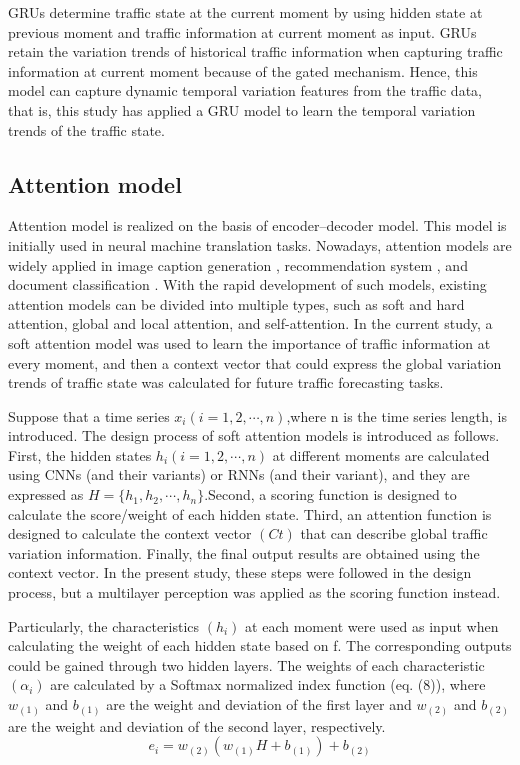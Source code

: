 \documentclass[10pt,journal,compsoc]{IEEEtran}
\begin{document}
\par GRUs determine traffic state at the current moment by using hidden state at previous moment and traffic information at current moment as input. GRUs retain the variation trends of historical traffic information when capturing traffic information at current moment because of the gated mechanism. Hence, this model can capture dynamic temporal variation features from the traffic data, that is, this study has applied a GRU model to learn the temporal variation trends of the traffic state.

\subsection{Attention model}
\par Attention model is realized on the basis of encoder–decoder model. This model is initially used in neural machine translation tasks\cite{bahdanau2014neural}. Nowadays, attention models are widely applied in image caption generation \cite{xu2015attend}, recommendation system \cite{xiao2017attentional}, and document classification \cite{Pappas2017Multilingual}. With the rapid development of such models, existing attention models can be divided into multiple types, such as soft and hard attention\cite{bahdanau2014neural}, global and local attention\cite{Luong2015Effective}, and self-attention\cite{vaswani2017attention}. In the current study, a soft attention model was used to learn the importance of traffic information at every moment, and then a context vector that could express the global variation trends of traffic state was calculated for future traffic forecasting tasks.
\par Suppose that a time series $x_i(i=1,2,\cdots,n)$,where n is the time series length, is introduced. The design process of soft attention models is introduced as follows. First, the hidden states $h_i(i=1,2,\cdots,n)$ at different moments are calculated using CNNs (and their variants) or RNNs (and their variant), and they are expressed as $H=\{h_1,h_2,\cdots,h_n\}$.Second, a scoring function is designed to calculate the score/weight of each hidden state.  Third, an attention function is designed to calculate the context vector $(Ct)$ that can describe global traffic variation information. Finally, the final output results are obtained using the context vector. In the present study, these steps were followed in the design process, but a multilayer perception was applied as the scoring function instead.
\par Particularly, the characteristics $(h_i)$ at each moment were used as input when calculating the weight of each hidden state based on f. The corresponding outputs could be gained through two hidden layers. The weights of each characteristic $(\alpha_i)$ are calculated by a Softmax normalized index function (eq. (8)), where $w_{(1)}$ and $b_{(1)}$ are the weight and deviation of the first layer and $w_{(2)}$ and $b_{(2)}$ are the weight and deviation of the second layer, respectively.
\begin{equation}
e_{i} = w_{(2)}(w_{(1)}H + b_{(1)}) + b_{(2)}
\end{equation}
\end{document}
